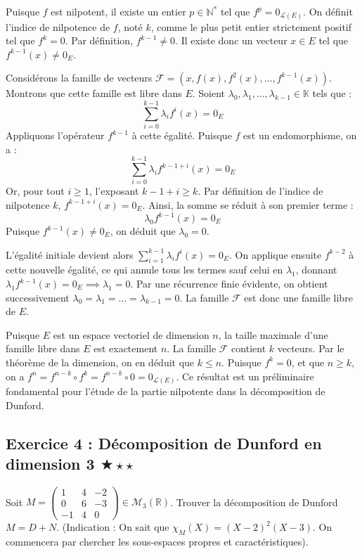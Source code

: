 \documentclass[11pt,a4paper]{article}
\begin{document}
Puisque $f$ est nilpotent, il existe un entier $p \in \mathbb{N}^*$ tel que $f^p = 0_{\mathcal{L}(E)}$.
On définit l'indice de nilpotence de $f$, noté $k$, comme le plus petit entier strictement positif tel que $f^k = 0$.
Par définition, $f^{k-1} \neq 0$.
Il existe donc un vecteur $x \in E$ tel que $f^{k-1}(x) \neq 0_E$.

Considérons la famille de vecteurs $\mathcal{F} = \left( x, f(x), f^2(x), \ldots, f^{k-1}(x) \right)$.
Montrons que cette famille est libre dans $E$.
Soient $\lambda_0, \lambda_1, \ldots, \lambda_{k-1} \in \mathbb{K}$ tels que :
$$ \sum_{i=0}^{k-1} \lambda_i f^i(x) = 0_E $$
Appliquons l'opérateur $f^{k-1}$ à cette égalité.
Puisque $f$ est un endomorphisme, on a :
$$ \sum_{i=0}^{k-1} \lambda_i f^{k-1+i}(x) = 0_E $$
Or, pour tout $i \geq 1$, l'exposant $k-1+i \geq k$. Par définition de l'indice de nilpotence $k$, $f^{k-1+i}(x) = 0_E$.
Ainsi, la somme se réduit à son premier terme :
$$ \lambda_0 f^{k-1}(x) = 0_E $$
Puisque $f^{k-1}(x) \neq 0_E$, on déduit que $\lambda_0 = 0$.

L'égalité initiale devient alors $\sum_{i=1}^{k-1} \lambda_i f^i(x) = 0_E$.
On applique ensuite $f^{k-2}$ à cette nouvelle égalité, ce qui annule tous les termes sauf celui en $\lambda_1$, donnant $\lambda_1 f^{k-1}(x) = 0_E \implies \lambda_1 = 0$.
Par une récurrence finie évidente, on obtient successivement $\lambda_0 = \lambda_1 = \ldots = \lambda_{k-1} = 0$.
La famille $\mathcal{F}$ est donc une famille libre de $E$.

Puisque $E$ est un espace vectoriel de dimension $n$, la taille maximale d'une famille libre dans $E$ est exactement $n$.
La famille $\mathcal{F}$ contient $k$ vecteurs.
Par le théorème de la dimension, on en déduit que $k \leq n$.
Puisque $f^k = 0$, et que $n \geq k$, on a $f^n = f^{n-k} \circ f^k = f^{n-k} \circ 0 = 0_{\mathcal{L}(E)}$.
Ce résultat est un préliminaire fondamental pour l'étude de la partie nilpotente dans la décomposition de Dunford.

\vspace{1cm}
\subsection*{Exercice 4 : Décomposition de Dunford en dimension 3 $\bigstar\star\star$}

Soit $M = \begin{pmatrix} 1 & 4 & -2 \\ 0 & 6 & -3 \\ -1 & 4 & 0 \end{pmatrix} \in \mathcal{M}_3(\mathbb{R})$.
Trouver la décomposition de Dunford $M = D + N$.
(Indication : On sait que $\chi_M(X) = (X-2)^2(X-3)$. On commencera par chercher les sous-espaces propres et caractéristiques).
\end{document}
